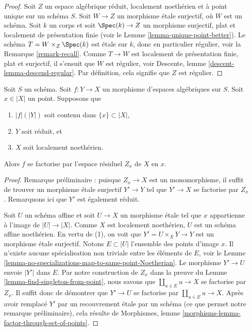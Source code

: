 \begin{proof}
Soit $Z$ un espace algébrique réduit, localement noethérien et à point unique
sur un schéma $S$. Soit $W \to Z$ un morphisme \'etale surjectif, où $W$
est un schéma. Soit $k$ un corps et soit $\Spec(k) \to Z$
un morphisme surjectif, plat et localement de présentation finie (voir le
Lemme \ref{lemma-unique-point-better}).
Le schéma $T = W \times_Z \Spec(k)$ est
\'etale sur $k$, donc en particulier régulier, voir la
Remarque \ref{remark-recall}.
Comme $T \to W$ est localement de présentation finie, plat et surjectif,
il s'ensuit que $W$ est régulier, voir
Descente, lemme \ref{descent-lemma-descend-regular}.
Par définition, cela signifie que $Z$ est régulier.
\end{proof}

\begin{lemma}
\label{lemma-factor-through-residual-space-Noetherian}
Soit $S$ un schéma. Soit $f : Y \to X$ un morphisme d'espaces
algébriques sur $S$. Soit $x \in |X|$ un point. Supposons que
\begin{enumerate}
\item $|f|(|Y|)$ soit contenu dans $\{x\} \subset |X|$,
\item $Y$ soit réduit, et
\item $X$ soit localement noethérien.
\end{enumerate}
Alors $f$ se factorise par l'espace résiduel $Z_x$ de $X$ en $x$.
\end{lemma}

\begin{proof}
Remarque préliminaire : puisque $Z_x \to X$ est un monomorphisme, il suffit
de trouver un morphisme \'etale surjectif $Y' \to Y$ tel que $Y' \to X$
se factorise par $Z_x$. Remarquons ici que $Y'$ est également réduit.

\medskip\noindent
Soit $U$ un schéma affine et soit $U \to X$ un morphisme \'etale
tel que $x$ appartienne à l'image de $|U| \to |X|$. Comme $X$ est localement
noethérien, $U$ est un schéma affine noethérien. En vertu de (1),
on voit que $Y' = U \times_X Y \to Y$ est un morphisme \'etale surjectif.
Notons $E \subset |U|$ l'ensemble des points d'image $x$.
Il n'existe aucune spécialisation non triviale entre les éléments de $E$, voir
le Lemme \ref{lemma-no-specializations-map-to-same-point-Noetherian}.
Le morphisme $Y' \to U$ envoie $|Y'|$ dans $E$. Par notre construction
de $Z_x$ dans la preuve du Lemme \ref{lemma-find-singleton-from-point},
nous savons que $\coprod_{u \in E} u \to X$ se factorise par $Z_x$.
Il suffit donc de démontrer que $Y' \to U$ se factorise par
$\coprod_{u \in E} u \to X$. Après avoir remplacé $Y'$ par un recouvrement
\'etale par un schéma (ce que permet notre remarque préliminaire), cela résulte
de Morphismes, lemme \ref{morphisms-lemma-factor-through-set-of-points}.
\end{proof}

